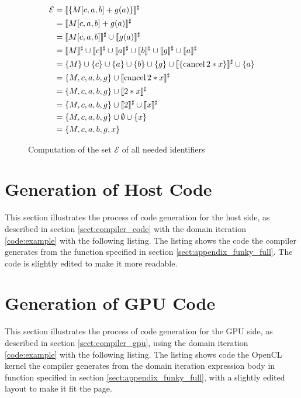 \begin{figure}[h]
	\begin{align*}
		\mathcal{E} &= \llbracket \{M \lbrack c,a,b\rbrack + g(a)\} \rrbracket^\sharp \\
					&= \llbracket M \lbrack c,a,b\rbrack + g(a) \rrbracket^\sharp \\
					&= \llbracket M \lbrack c,a,b\rbrack \rrbracket^\sharp \cup \llbracket g(a) \rrbracket^\sharp \\
					&= \llbracket M \rrbracket^\sharp \cup \llbracket c \rrbracket^\sharp \cup \llbracket a \rrbracket^\sharp \cup \llbracket b \rrbracket^\sharp \cup \llbracket g \rrbracket^\sharp \cup \llbracket a \rrbracket^\sharp \\
					&= \left\{ M \right\} \cup\left\{ c \right\} \cup\left\{ a \right\} \cup\left\{ b \right\} \cup\left\{ g \right\} \cup \llbracket \left\{ \operatorname{cancel} 2*x \right\} \rrbracket^\sharp \cup \left\{ a \right\} \\
					&= \left\{ M,c,a,b,g \right\} \cup \llbracket \operatorname{cancel} 2*x \rrbracket^\sharp \\
					&= \left\{ M,c,a,b,g \right\} \cup \llbracket 2*x \rrbracket^\sharp \\
					&= \left\{ M,c,a,b,g \right\} \cup \llbracket 2 \rrbracket^\sharp \cup \llbracket x \rrbracket^\sharp \\
					&= \left\{ M,c,a,b,g \right\} \cup \emptyset \cup \left\{ x \right\} \\
					&= \left\{ M,c,a,b,g,x \right\}
	\end{align*}
	\caption{Computation of the set $\mathcal{E}$ of all needed identifiers} 
\end{figure}
\newpage



\section{Generation of Host Code}
\label{ex:generated_code}
This section illustrates the process of code generation for the host side, as described in section \ref{sect:compiler_code} with the domain iteration \ref{code:example} with the following listing. The listing shows the code the compiler generates from the function  specified in section \ref{sect:appendix_funky_full}. The code is slightly edited to make it more readable. \\

\newpage



\section{Generation of GPU Code}
\label{ex:generated_code_gpu}
This section illustrates the process of code generation for the GPU side, as described in section \ref{sect:compiler_gpu}, using the domain iteration \ref{code:example} with the following listing. The listing shows code the OpenCL kernel the compiler generates from the domain iteration expression body in function  specified in section \ref{sect:appendix_funky_full}, with a slightly edited layout to make it fit the page. \\

\newpage



